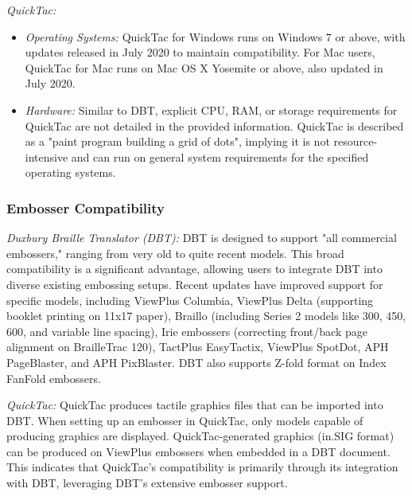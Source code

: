 \emph{QuickTac:}
\begin{itemize}
    \item \emph{Operating Systems:} QuickTac for Windows runs on Windows 7 or above, with updates released in July 2020 to maintain compatibility.\cite{DuxburyProducts} For Mac users, QuickTac for Mac runs on Mac OS X Yosemite or above, also updated in July 2020.\cite{DuxburyProducts}
    \item \emph{Hardware:} Similar to DBT, explicit CPU, RAM, or storage requirements for QuickTac are not detailed in the provided information.\cite{ElitaElPicsPrint,DuxburyProducts,ElitaManual} QuickTac is described as a "paint program building a grid of dots", implying it is not resource-intensive and can run on general system requirements for the specified operating systems.
\end{itemize}

\subsubsection{Embosser Compatibility}

\emph{Duxbury Braille Translator (DBT):}
DBT is designed to support "all commercial embossers," ranging from very old to quite recent models.\cite{PerkinsTouchMapper,IrieBrailleTrac,ElitaElPicsPrint,ViewplusTigerSuite} This broad compatibility is a significant advantage, allowing users to integrate DBT into diverse existing embossing setups. Recent updates have improved support for specific models, including ViewPlus Columbia, ViewPlus Delta (supporting booklet printing on 11x17 paper), Braillo (including Series 2 models like 300, 450, 600, and variable line spacing), Irie embossers (correcting front/back page alignment on BrailleTrac 120), TactPlus EasyTactix, ViewPlus SpotDot, APH PageBlaster, and APH PixBlaster.\cite{SoftorageInkscape} DBT also supports Z-fold format on Index FanFold embossers.\cite{SoftorageInkscape}

\emph{QuickTac:}
QuickTac produces tactile graphics files that can be imported into DBT.\cite{TouchMapper,ElitaElPicsPrint,ViewplusTSS,DuxburyDetails,SoftorageInkscape} When setting up an embosser in QuickTac, only models capable of producing graphics are displayed.\cite{DuxburyDetails} QuickTac-generated graphics (in.SIG format) can be produced on ViewPlus embossers when embedded in a DBT document.\cite{SoftorageInkscape} This indicates that QuickTac's compatibility is primarily through its integration with DBT, leveraging DBT's extensive embosser support.

